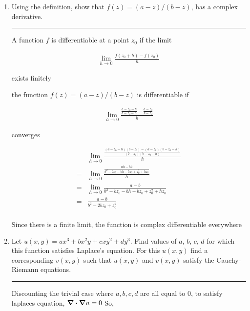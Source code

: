 \documentclass[12pt, oneside]{article}
\newenvironment{answer}
  {\vspace*{0.2cm} \rule{12cm}{0.02cm} \vspace*{0.2cm}}
  {\vspace*{0.2cm}}
\begin{document}
\begin{enumerate}
\begin{answer}
  \end{answer}

  \item Using the definition, show that $f(z) = (a - z)/(b - z)$, has a complex derivative.

  \begin{answer}

    A function $f$ is differentiable at a point $z_0$ if the limit

    \begin{align*}
      \lim_{h\to0} \frac{f(z_0 + h) - f(z_0)}{h}
    \end{align*}

    exists finitely

    the function $f(z) = (a - z)/(b - z)$ is differentiable if

    \begin{align*}
      \lim_{h\to0} \frac{\frac{a - z_0 - h}{b - z_0 - h} - \frac{a - z_0}{b - z_0}}{h}
    \end{align*}

    converges

    \begin{align*}
      &\lim_{h\to0} \frac{\frac{(a-z_0-h)(b-z_0) - (a-z_0)(b-z_0-h)}{(b-z_0)(b - z_0 - h)}}{h}\\
      =&\lim_{h\to0} \frac{\frac{ah - bh}{b^2 - bz_0 -bh - bz_0 +z_0^2 + hz_0}}{h}\\
      =&\lim_{h\to0} \frac{a - b}{b^2 - bz_0 -bh - bz_0 +z_0^2 + hz_0}\\
      =&\frac{a - b}{b^2 - 2bz_0 +z_0^2}\\
    \end{align*}

    Since there is a finite limit, the function is complex differentiable everywhere
  \end{answer}

  \item Let $u(x,y) = ax^3 + bx^2y + cxy^2 + dy^3$. Find values of $a$, $b$, $c$, $d$ for which this function satisfies Laplace’s equation. For this $u(x,y)$ find a corresponding $v(x,y)$ such that $u(x,y)$ and $v(x,y)$ satisfy the Cauchy-Riemann equations.

  \begin{answer}

    Discounting the trivial case where $a,b,c,d$ are all equal to $0$, to satisfy laplaces equation, $\divergence \gradient u = 0$ So,


\end{answer}
\end{enumerate}
\end{document}
